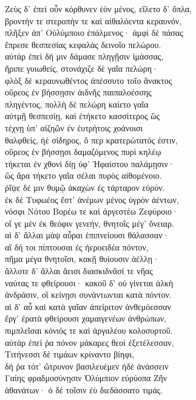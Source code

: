 \begin{pages}
\begin{Leftside}
\quad{}Ζεὺς δ' ἐπεὶ οὖν κόρθυνεν ἑὸν μένος, εἵλετο δ' ὅπλα,\\
βροντήν τε στεροπήν τε καὶ αἰθαλόεντα κεραυνόν,\\
πλῆξεν ἀπ' Οὐλύμποιο ἐπάλμενος· ἀμφὶ δὲ πάσας \\
ἔπρεσε θεσπεσίας κεφαλὰς δεινοῖο πελώρου.\\
αὐτὰρ ἐπεὶ δή μιν δάμασε πληγῇσιν ἱμάσσας,\\
ἤριπε γυιωθείς, στονάχιζε δὲ γαῖα πελώρη· \\
φλὸξ δὲ κεραυνωθέντος ἀπέσσυτο τοῖο ἄνακτος\\
οὔρεος ἐν βήσσῃσιν ἀιδνῆς παιπαλοέσσης \\
πληγέντος, πολλὴ δὲ πελώρη καίετο γαῖα \\
αὐτμῇ θεσπεσίῃ, καὶ ἐτήκετο κασσίτερος ὣς\\
τέχνῃ ὑπ' αἰζηῶν ἐν ἐυτρήτοις χοάνοισι\\
θαλφθείς, ἠὲ σίδηρος, ὅ περ κρατερώτατός ἐστιν, \\
οὔρεος ἐν βήσσῃσι δαμαζόμενος πυρὶ κηλέῳ \\
τήκεται ἐν χθονὶ δίῃ ὑφ' Ἡφαίστου παλάμῃσιν· \\
ὣς ἄρα τήκετο γαῖα σέλαι πυρὸς αἰθομένοιο.\\
ῥῖψε δέ μιν θυμῷ ἀκαχὼν ἐς τάρταρον εὐρύν. \\

\quad{}ἐκ δὲ Τυφωέος ἔστ' ἀνέμων μένος ὑγρὸν ἀέντων,\\
νόσφι Νότου Βορέω τε καὶ ἀργεστέω Ζεφύροιο· \\
οἵ γε μὲν ἐκ θεόφιν γενεήν, θνητοῖς μέγ' ὄνειαρ.\\
αἱ δ' ἄλλαι μὰψ αὖραι ἐπιπνείουσι θάλασσαν·\\
αἳ δή τοι πίπτουσαι ἐς ἠεροειδέα πόντον,\\
πῆμα μέγα θνητοῖσι, κακῇ θυίουσιν ἀέλλῃ· \\
ἄλλοτε δ' ἄλλαι ἄεισι διασκιδνᾶσί τε νῆας \\
ναύτας τε φθείρουσι· κακοῦ δ' οὐ γίνεται ἀλκὴ \\
ἀνδράσιν, οἳ κείνῃσι συνάντωνται κατὰ πόντον. \\
αἱ δ' αὖ καὶ κατὰ γαῖαν ἀπείριτον ἀνθεμόεσσαν\\
ἔργ' ἐρατὰ φθείρουσι χαμαιγενέων ἀνθρώπων, \\
πιμπλεῖσαι κόνιός τε καὶ ἀργαλέου κολοσυρτοῦ. \\

{\minion\Para}
αὐτὰρ ἐπεί ῥα πόνον μάκαρες θεοὶ ἐξετέλεσσαν, \\
Τιτήνεσσι δὲ τιμάων κρίναντο βίηφι,\\
δή ῥα τότ' ὤτρυνον βασιλευέμεν ἠδὲ ἀνάσσειν\\
Γαίης φραδμοσύνῃσιν Ὀλύμπιον εὐρύοπα Ζῆν\\
ἀθανάτων· ὁ δὲ τοῖσιν ἐὺ διεδάσσατο τιμάς. \\


\end{Leftside}
\end{pages}
